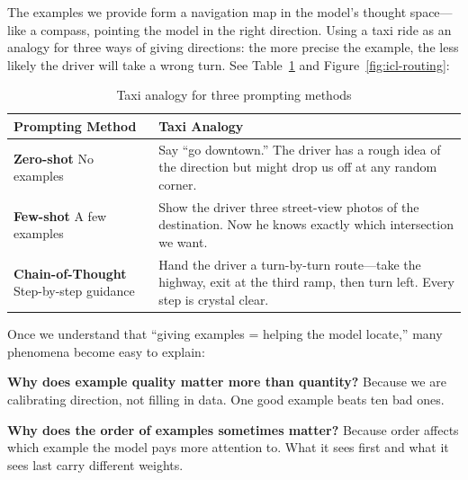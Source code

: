 \vspace{1em}

The examples we provide form a navigation map in the model's thought space---like a compass, pointing the model in the right direction.
Using a taxi ride as an analogy for three ways of giving directions: the more precise the example, the less likely the driver will take a wrong turn. See Table~\ref{tab:icl-routing} and Figure~\ref{fig:icl-routing}:

\vspace{0.5em}

\begin{table}[ht]
\noindent\hspace*{-0.3cm}
\begin{tabular}{p{3cm} p{7.5cm}}
\toprule
\textbf{Prompting Method} & \textbf{Taxi Analogy} \\
\midrule
\textbf{Zero-shot} \newline No examples &
Say ``go downtown.'' The driver has a rough idea of the direction but might drop us off at any random corner. \\[0em]

\textbf{Few-shot} \newline A few examples &
Show the driver three street-view photos of the destination. Now he knows exactly which intersection we want.\\[0em]

\textbf{Chain-of-Thought} \newline Step-by-step guidance &
Hand the driver a turn-by-turn route---take the highway, exit at the third ramp, then turn left. Every step is crystal clear.\\
\bottomrule

\end{tabular}

\caption[Taxi analogy for three prompting methods]{Taxi analogy for three prompting methods}
\label{tab:icl-routing}

\end{table}

Once we understand that ``giving examples = helping the model locate,'' many phenomena become easy to explain:

\textbf{Why does example quality matter more than quantity?} Because we are calibrating direction, not filling in data. One good example beats ten bad ones.

\vspace{1em}

\textbf{Why does the order of examples sometimes matter?} Because order affects which example the model pays more attention to. What it sees first and what it sees last carry different weights.

